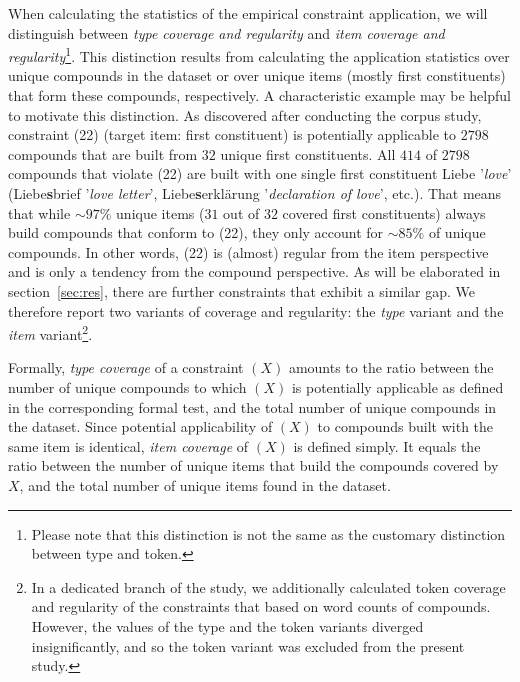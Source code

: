 \documentclass[10pt, a4paper]{article}
\begin{document}

When calculating the statistics of the empirical constraint application, we will distinguish between \textit{type coverage and regularity} and \textit{item coverage and regularity}\footnote{Please note that this distinction is not the same as the customary distinction between type and token.}. This distinction results from calculating the application statistics over unique compounds in the dataset or over unique items (mostly first constituents) that form these compounds, respectively. A characteristic example may be helpful to motivate this distinction. As discovered after conducting the corpus study, constraint (22) (target item: first constituent) is potentially applicable to $2798$ compounds that are built from $32$ unique first constituents. All $414$ of $2798$ compounds that violate (22) are built with one single first constituent Liebe '\textit{love}' (Liebe\textbf{s}brief '\textit{love letter}', Liebe\textbf{s}erklärung '\textit{declaration of love}', etc.).
That means that while $\sim97\%$ unique items ($31$ out of $32$ covered first constituents) always build compounds that conform to (22), they only account for $\sim85\%$ of unique compounds. In other words, (22) is (almost) regular from the item perspective and is only a tendency from the compound perspective. As will be elaborated in section~\ref{sec:res}, there are further constraints that exhibit a similar gap. We therefore report two variants of coverage and regularity: the \textit{type} variant and the \textit{item} variant\footnote{In a dedicated branch of the study, we additionally calculated token coverage and regularity of the constraints that based on word counts of compounds. However, the values of the type and the token variants diverged insignificantly, and so the token variant was excluded from the present study.}.

Formally, \textit{type coverage} of a constraint $(X)$ amounts to the ratio between the number of unique compounds to which $(X)$ is potentially applicable as defined in the corresponding formal test, and the total number of unique compounds in the dataset. Since potential applicability of $(X)$ to compounds built with the same item is identical, \textit{item coverage} of $(X)$ is defined simply. It equals the ratio between the number of unique items that build the compounds covered by $X$, and the total number of unique items found in the dataset.
\end{document}
